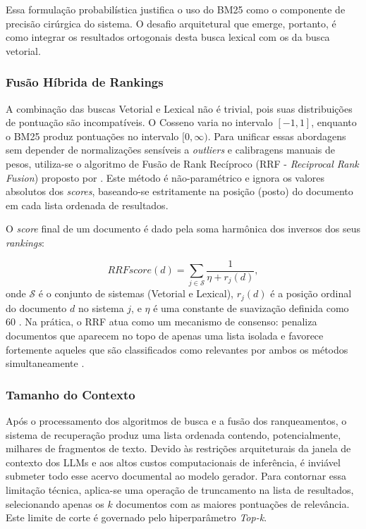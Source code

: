 Essa formulação probabilística justifica o uso do BM25 como o componente de precisão cirúrgica do sistema. O desafio arquitetural que emerge, portanto, é como integrar os resultados ortogonais desta busca lexical com os da busca vetorial.

\subsubsection{Fusão Híbrida de Rankings}

A combinação das buscas Vetorial e Lexical não é trivial, pois suas distribuições de pontuação são incompatíveis. O Cosseno varia no intervalo $[-1, 1]$, enquanto o BM25 produz pontuações no intervalo $[0, \infty)$. Para unificar essas abordagens sem depender de normalizações sensíveis a \textit{outliers} e calibragens manuais de pesos, utiliza-se o algoritmo de Fusão de Rank Recíproco (RRF - \textit{Reciprocal Rank Fusion}) proposto por \citet{cormack2009}. Este método é não-paramétrico e ignora os valores absolutos dos \textit{scores}, baseando-se estritamente na posição (posto) do documento em cada lista ordenada de resultados.

O \textit{score} final de um documento é dado pela soma harmônica dos inversos dos seus \textit{rankings}:

\begin{equation}
  RRFscore(d) = \sum_{j \in \mathcal{S}} \frac{1}{\eta + r_j(d)},
\end{equation}
onde $\mathcal{S}$ é o conjunto de sistemas (Vetorial e Lexical), $r_j(d)$ é a posição ordinal do documento $d$ no sistema $j$, e $\eta$ é uma constante de suavização definida como 60 \citep{cormack2009}. Na prática, o RRF atua como um mecanismo de consenso: penaliza documentos que aparecem no topo de apenas uma lista isolada e favorece fortemente aqueles que são classificados como relevantes por ambos os métodos simultaneamente \citep{rankrag}.


\subsubsection{Tamanho do Contexto}

Após o processamento dos algoritmos de busca e a fusão dos ranqueamentos, o sistema de recuperação produz uma lista ordenada contendo, potencialmente, milhares de fragmentos de texto. Devido às restrições arquiteturais da janela de contexto dos LLMs e aos altos custos computacionais de inferência, é inviável submeter todo esse acervo documental ao modelo gerador. Para contornar essa limitação técnica, aplica-se uma operação de truncamento na lista de resultados, selecionando apenas os $k$ documentos com as maiores pontuações de relevância. Este limite de corte é governado pelo hiperparâmetro \textit{Top-k}.

